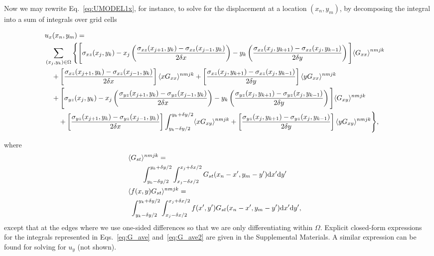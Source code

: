 \documentclass[aps,prl,reprint,twocolumn,groupedaddress,showpacs]{revtex4-1}
\def\dd{\mbox{d}}
\begin{document}
Now we may rewrite Eq.~\ref{eq:UMODEL1x}, for instance, to solve for the displacement at a location $(x_n,y_m)$, by decomposing the integral into a sum of integrals over grid cells
%
\begin{widetext}
\begin{align}
 \lefteqn{u_x(x_n,y_m) =} \nonumber\\
 & \sum_{(x_j,y_k)\in\Omega} \Bigg\{ \Bigg[\sigma_{xz}(x_j,y_k)  - x_j\left(\frac{\sigma_{xz}(x_{j+1},y_k) - \sigma_{xz}(x_{j-1},y_k) }{2\delta x }    \right)    -y_k\left( \frac{\sigma_{xz}(x_j,y_{k+1}) -  \sigma_{xz}(x_j,y_{k-1}) }{2\delta y}\right) \Bigg]{ \langle G_{xx} \rangle}^{nmjk} \nonumber \\
&\quad+\left[ \frac{\sigma_{xz}(x_{j+1},y_k) -  \sigma_{xz}(x_{j-1},y_k) }{2\delta x}   \right]\langle xG_{xx} \rangle^{nmjk} + \left[  \frac{\sigma_{xz}(x_j,y_{k+1}) - \sigma_{xz}(x_j,y_{k-1}) }{2\delta y} \right] \langle yG_{xx} \rangle^{nmjk}\nonumber\\
&\quad+  \Bigg[\sigma_{yz}(x_j,y_k) -x_j\left(\frac{\sigma_{yz}(x_{j+1},y_k) - \sigma_{yz}(x_{j-1},y_k) }{2\delta x}    \right)    -y_k\left( \frac{\sigma_{yz}(x_j,y_{k+1}) - \sigma_{yz}(x_j,y_{k-1}) }{2\delta y}\right) \Bigg] \langle G_{xy} \rangle^{nmjk}\nonumber \\
&\qquad +\left[ \frac{\sigma_{yz}(x_{j+1},y_k) -  \sigma_{yz}(x_{j-1},y_k) }{2\delta x}   \right]  \int_{y_k-\delta y/2}^{y_k+\delta y/2}  \langle xG_{xy} \rangle^{nmjk} + \left[  \frac{\sigma_{yz}(x_j,y_{k+1}) - \sigma_{yz}(x_j,y_{k-1}) }{2\delta y} \right] \langle yG_{xy} \rangle^{nmjk} \Bigg\},
\label{eq:ux_decomposed}
\end{align}
\end{widetext}
where
\begin{align}
\lefteqn{\langle G_{st} \rangle^{nmjk} = }\nonumber\\
&\qquad    \int_{y_k-\delta y/2}^{y_k+\delta y/2} \int_{x_j-\delta x/2}^{x_j+\delta x/2} G_{st}(x_n-x',y_m-y') \dd x' \dd y' \label{eq:G_ave} \\
\lefteqn{\langle f(x,y)G_{st} \rangle^{nmjk} =}  \nonumber\\
&\  \int_{y_k-\delta y/2}^{y_k+\delta y/2} \int_{x_j-\delta x/2}^{x_j+\delta x/2} f(x',y')G_{st}(x_n-x',y_m-y') \dd x' \dd y', \label{eq:G_ave2} 
\end{align}
except that at the edges where we use one-sided differences so that we are only differentiating within $\Omega$. Explicit 
closed-form expressions for the integrals represented in Eqs.~\ref{eq:G_ave} and~\ref{eq:G_ave2} are given in the Supplemental Materials. A similar expression can be found for solving for $u_y$ (not shown).
\end{document}
